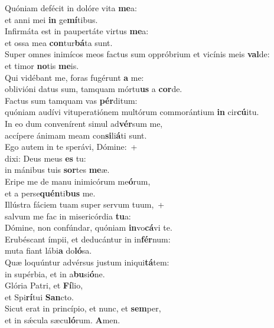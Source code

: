 \evenverse Quóniam defécit in dolóre vita \textbf{me}a:~\*\\
\evenverse et anni mei \textbf{in} ge\textbf{mí}tibus.\\
\oddverse Infirmáta est in paupertáte virtus \textbf{me}a:~\*\\
\oddverse et ossa mea \textbf{con}tur\textbf{bá}ta sunt.\\
\evenverse Super omnes inimícos meos factus sum oppróbrium et vicínis meis \textbf{val}de:~\*\\
\evenverse et timor \textbf{no}tis \textbf{me}is.\\
\oddverse Qui vidébant me, foras fugérunt \textbf{a} me:~\*\\
\oddverse oblivióni datus sum, tamquam mórtu\textbf{us} a \textbf{cor}de.\\
\evenverse Factus sum tamquam vas \textbf{pér}ditum:~\*\\
\evenverse quóniam audívi vituperatiónem multórum commorántium \textbf{in} cir\textbf{cú}itu.\\
\oddverse In eo dum convenírent simul ad\textbf{vér}sum me,~\*\\
\oddverse accípere ánimam meam con\textbf{si}li\textbf{á}ti sunt.\\
\evenverse Ego autem in te sperávi, Dómine:~+\\
\evenverse  dixi: Deus meus \textbf{es} tu:~\*\\
\evenverse in mánibus tuis \textbf{sor}tes \textbf{me}æ.\\
\oddverse Eripe me de manu inimicórum me\textbf{ó}rum,~\*\\
\oddverse et a perse\textbf{quén}ti\textbf{bus} me.\\
\evenverse Illústra fáciem tuam super servum tuum,~+\\
\evenverse  salvum me fac in misericórdia \textbf{tu}a:~\*\\
\evenverse Dómine, non confúndar, quóniam \textbf{in}vo\textbf{cá}vi te.\\
\oddverse Erubéscant ímpii, et deducántur in in\textbf{fér}num:~\*\\
\oddverse muta fiant lábi\textbf{a} do\textbf{ló}sa.\\
\evenverse Quæ loquúntur advérsus justum iniqui\textbf{tá}tem:~\*\\
\evenverse in supérbia, et in a\textbf{bu}si\textbf{ó}ne.\\
\oddverse Glória Patri, et \textbf{Fí}lio,~\*\\
\oddverse et Spi\textbf{rí}tui \textbf{San}cto.\\
\evenverse Sicut erat in princípio, et nunc, et \textbf{sem}per,~\*\\
\evenverse et in sǽcula sæcu\textbf{ló}rum. \textbf{A}men.\\
